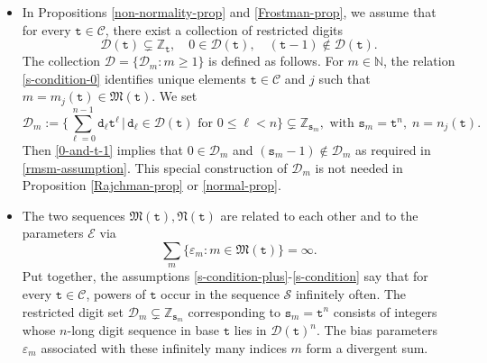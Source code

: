 \documentclass[12pt, twoside]{article}
\theoremstyle{definition}
\numberwithin{equation}{section}
\begin{document}
\begin{itemize}
 \item In Propositions \ref{non-normality-prop} and \ref{Frostman-prop}, we assume that  for every $\mathtt t \in \mathscr{C}$, there exist a collection of restricted digits 
\begin{equation} \label{0-and-t-1}
\mathscr{D}(\mathtt t) \subsetneq \mathbb Z_{\mathtt t}, \quad 0 \in \mathscr{D}(\mathtt t), \quad (\mathtt t-1) \not\in \mathscr{D}(\mathtt t). \end{equation} 
The collection $\mathcal D = \bigl\{ \mathscr{D}_m : m \geq 1\bigr\}$ is defined as follows. For $m \in \mathbb N$, the relation \eqref{s-condition-0} identifies unique elements $\mathtt t \in \mathscr{C}$ and $j$ such that $m = m_j(\mathtt t) \in \mathfrak M(\mathtt t)$. We set  
\begin{equation} \label{s-condition-1}
\mathscr{D}_{m} := \Biggl\{\sum_{\ell=0}^{n-1} \mathtt d_{\ell} \mathtt t^{\ell} \, \bigl| \, \mathtt d_{\ell} \in \mathscr{D}(\mathtt t) \text{ for } 0 \leq \ell < n \Biggr\} \subsetneq \mathbb Z_{\mathtt s_{m}}, \text{ with } \mathtt s_m = \mathtt t^{n}, \;  n = n_j(\mathtt t).
\end{equation} 
Then \eqref{0-and-t-1} implies that $0 \in \mathscr{D}_m $ and $(\mathtt s_m - 1) \notin \mathscr{D}_m$ as required in \eqref{rmsm-assumption}. This special construction of $\mathscr{D}_{m}$ is not needed in Proposition \ref{Rajchman-prop} or \ref{normal-prop}.
\item The two sequences $\mathfrak M(\mathtt t), \mathfrak N(\mathtt t)$ are related to each other and to the parameters $\mathcal E$  via
\begin{equation}
	\sum_m \bigl\{ \varepsilon_{m} : m \in \mathfrak M(\mathtt t) \bigr\} = \infty.  \label{s-condition}
\end{equation} 
Put together, the assumptions \eqref{s-condition-plus}-\eqref{s-condition} say that for every $\mathtt t \in \mathscr{C}$, powers of $\mathtt t$ occur in the sequence $\mathcal S$ infinitely often. The restricted digit set $\mathscr{D}_m\subsetneq \mathbb Z_{\mathtt s_m}$ corresponding to $\mathtt s_m = \mathtt t^n$ consists of integers whose $n$-long digit sequence in base $\mathtt t$ lies in $\mathscr{D}(\mathtt t)^n$. The bias parameters $\varepsilon_m$ associated with these infinitely many indices $m$ form a divergent sum.

\end{itemize}
\end{document}
